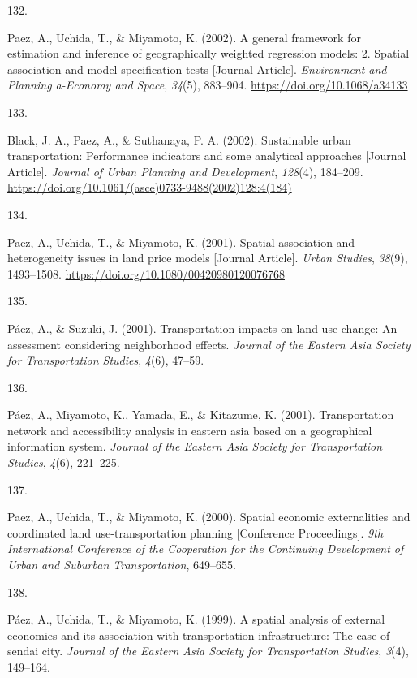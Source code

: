 \documentclass[10pt,a4paper,]{twentysecondcv}
\newlength{\csllabelwidth}
\newcommand{\CSLLeftMargin}[1]{\parbox[t]{\csllabelwidth}{#1}}
\newcommand{\CSLRightInline}[1]{\parbox[t]{\linewidth - \csllabelwidth}{#1}}
\begin{document}
\leavevmode{}%
\CSLLeftMargin{132. }%
\CSLRightInline{Paez, A., Uchida, T., \& Miyamoto, K. (2002). A general
framework for estimation and inference of geographically weighted
regression models: 2. Spatial association and model specification tests
{[}Journal Article{]}. \emph{Environment and Planning a-Economy and
Space}, \emph{34}(5), 883--904. \url{https://doi.org/10.1068/a34133}}

\leavevmode{}%
\CSLLeftMargin{133. }%
\CSLRightInline{Black, J. A., Paez, A., \& Suthanaya, P. A. (2002).
Sustainable urban transportation: Performance indicators and some
analytical approaches {[}Journal Article{]}. \emph{Journal of Urban
Planning and Development}, \emph{128}(4), 184--209.
\url{https://doi.org/10.1061/(asce)0733-9488(2002)128:4(184)}}

\leavevmode{}%
\CSLLeftMargin{134. }%
\CSLRightInline{Paez, A., Uchida, T., \& Miyamoto, K. (2001). Spatial
association and heterogeneity issues in land price models {[}Journal
Article{]}. \emph{Urban Studies}, \emph{38}(9), 1493--1508.
\url{https://doi.org/10.1080/00420980120076768}}

\leavevmode{}%
\CSLLeftMargin{135. }%
\CSLRightInline{Páez, A., \& Suzuki, J. (2001). Transportation impacts
on land use change: An assessment considering neighborhood effects.
\emph{Journal of the Eastern Asia Society for Transportation Studies},
\emph{4}(6), 47--59.}

\leavevmode{}%
\CSLLeftMargin{136. }%
\CSLRightInline{Páez, A., Miyamoto, K., Yamada, E., \& Kitazume, K.
(2001). Transportation network and accessibility analysis in eastern
asia based on a geographical information system. \emph{Journal of the
Eastern Asia Society for Transportation Studies}, \emph{4}(6),
221--225.}

\leavevmode{}%
\CSLLeftMargin{137. }%
\CSLRightInline{Paez, A., Uchida, T., \& Miyamoto, K. (2000). Spatial
economic externalities and coordinated land use-transportation planning
{[}Conference Proceedings{]}. \emph{9th International Conference of the
Cooperation for the Continuing Development of Urban and Suburban
Transportation}, 649--655.}

\leavevmode{}%
\CSLLeftMargin{138. }%
\CSLRightInline{Páez, A., Uchida, T., \& Miyamoto, K. (1999). A spatial
analysis of external economies and its association with transportation
infrastructure: The case of sendai city. \emph{Journal of the Eastern
Asia Society for Transportation Studies}, \emph{3}(4), 149--164.}
\end{document}
